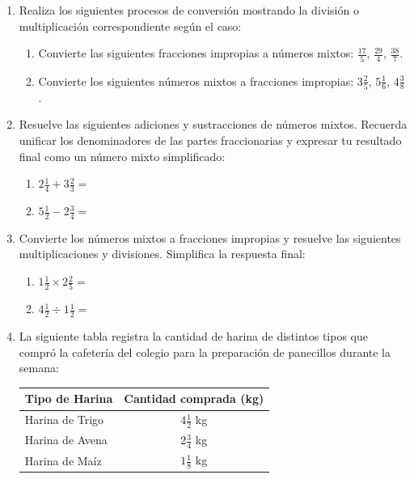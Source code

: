 \documentclass[12pt, letterpaper]{article}
\begin{document}
	\begin{enumerate}[itemsep=0.8cm]
		
		\item Realiza los siguientes procesos de conversión mostrando la división o multiplicación correspondiente según el caso:
		\begin{enumerate}[label=\alph*., itemsep=0.3cm, topsep=0.2cm]
			\item Convierte las siguientes fracciones impropias a números mixtos: $\displaystyle \frac{17}{5}$, $\displaystyle \frac{29}{4}$, $\displaystyle \frac{38}{7}$.
			\item Convierte los siguientes números mixtos a fracciones impropias: $\displaystyle 3 \frac{2}{5}$, $\displaystyle 5 \frac{1}{6}$, $\displaystyle 4 \frac{3}{8}$.
		\end{enumerate}
		
		\item Resuelve las siguientes adiciones y sustracciones de números mixtos. Recuerda unificar los denominadores de las partes fraccionarias y expresar tu resultado final como un número mixto simplificado:
		\begin{enumerate}[label=\alph*., itemsep=0.3cm, topsep=0.2cm]
			\item $\displaystyle 2 \frac{1}{4} + 3 \frac{2}{3} =$
			\item $\displaystyle 5 \frac{1}{2} - 2 \frac{3}{4} =$
		\end{enumerate}
		
		\item Convierte los números mixtos a fracciones impropias y resuelve las siguientes multiplicaciones y divisiones. Simplifica la respuesta final:
		\begin{enumerate}[label=\alph*., itemsep=0.3cm, topsep=0.2cm]
			\item $\displaystyle 1 \frac{1}{2} \times 2 \frac{2}{5} =$
			\item $\displaystyle 4 \frac{1}{2} \div 1 \frac{1}{2} =$
		\end{enumerate}
		
		\item La siguiente tabla registra la cantidad de harina de distintos tipos que compró la cafetería del colegio para la preparación de panecillos durante la semana:
		
		\begin{table}[h]
			\centering
			\begin{tabular}{lc}
				\toprule
				\textbf{Tipo de Harina} & \textbf{Cantidad comprada (kg)} \\
				\midrule
				Harina de Trigo & $\displaystyle 4 \frac{1}{2}$ kg \\[0.2cm]
				Harina de Avena & $\displaystyle 2 \frac{3}{4}$ kg \\[0.2cm]
				Harina de Maíz  & $\displaystyle 1 \frac{1}{8}$ kg \\
				\bottomrule
			\end{tabular}
		\end{table}
		

\end{enumerate}
\end{document}
